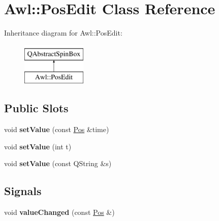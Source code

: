 \hypertarget{class_awl_1_1_pos_edit}{}\section{Awl\+:\+:Pos\+Edit Class Reference}
\label{class_awl_1_1_pos_edit}
Inheritance diagram for Awl\+:\+:Pos\+Edit\+:\begin{figure}[H]
\begin{center}
\leavevmode
\includegraphics[height=2.000000cm]{class_awl_1_1_pos_edit}
\end{center}
\end{figure}
\subsection*{Public Slots}
\begin{DoxyCompactItemize}
\item 
\mbox{\label{class_awl_1_1_pos_edit_a510d6163613857ce07b08e23f2c0e6f6}} 
void {\bfseries set\+Value} (const \hyperlink{class_ms_1_1_pos}{Pos} \&time)
\item 
\mbox{\label{class_awl_1_1_pos_edit_ada6befcd800d910e910b599e8134cc46}} 
void {\bfseries set\+Value} (int t)
\item 
\mbox{\label{class_awl_1_1_pos_edit_ae5721f2e18b8f8cc59942e2874275620}} 
void {\bfseries set\+Value} (const Q\+String \&s)
\end{DoxyCompactItemize}
\subsection*{Signals}
\begin{DoxyCompactItemize}
\item 
\mbox{\label{class_awl_1_1_pos_edit_ad10057e9ecd01cf3c180fab5129df62a}} 
void {\bfseries value\+Changed} (const \hyperlink{class_ms_1_1_pos}{Pos} \&)
\end{DoxyCompactItemize}
